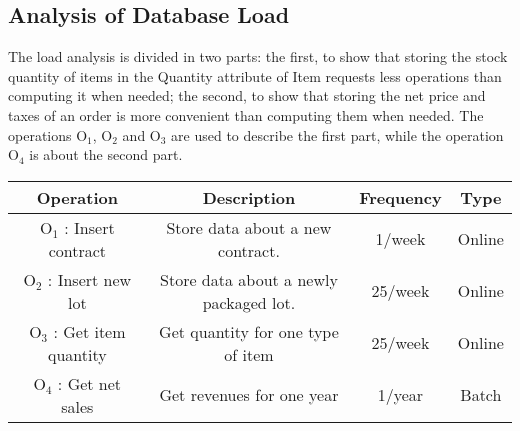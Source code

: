 \newpage
\subsection{Analysis of Database Load}
The load analysis is divided in two parts: the first, to show that storing the stock quantity of items in the Quantity attribute of Item requests less operations than computing it when needed; the second, to show that storing the net price and taxes of an order is more convenient than computing them when needed.
The operations $ \textrm{O}_\textrm{1} $, $ \textrm{O}_\textrm{2} $ and $ \textrm{O}_\textrm{3} $ are used to describe the first part, while the operation $ \textrm{O}_\textrm{4} $ is about the second part.

\begin{table}[!h]
	\begin{center}
		\begin{tabular}{ | c | c | c | c | }
			\hline
			\textbf{Operation} & \textbf{Description} & \textbf{Frequency} & \textbf{Type} \\ \hline
			$ \textrm{O}_\textrm{1} $ : Insert contract & Store data about a new contract. & 1/week & Online \\ \hline
			$ \textrm{O}_\textrm{2} $ : Insert new lot & Store data about a newly packaged lot. & 25/week & Online \\ \hline
			$ \textrm{O}_\textrm{3} $ : Get item quantity  & Get quantity for one type of item & 25/week & Online \\\hline
			$ \textrm{O}_\textrm{4} $ : Get net sales  & Get revenues for one year & 1/year & Batch \\\hline
		\end{tabular}
	\end{center}
\end{table}


